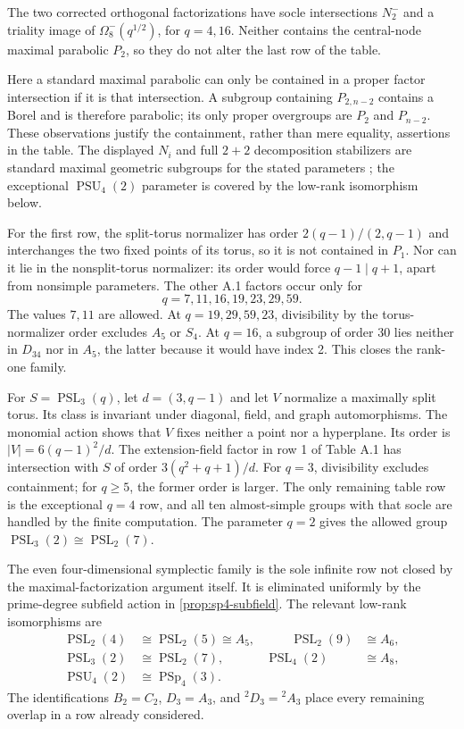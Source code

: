 \documentclass[11pt]{amsart}
\newcommand{\PSL}{\operatorname{PSL}}
\newcommand{\PSU}{\operatorname{PSU}}
\newcommand{\PSp}{\operatorname{PSp}}
\theoremstyle{definition}
\begin{document}
The two corrected orthogonal factorizations have socle intersections
\(N_2^-\) and a triality image of
\(\Omega_8^-(q^{1/2})\), for \(q=4,16\).  Neither contains the central-node
maximal parabolic \(P_2\), so they do not alter the last row of the table.

Here a standard maximal parabolic can only be contained in a proper factor
intersection if it is that intersection.  A subgroup containing
\(P_{2,n-2}\) contains a Borel and is therefore parabolic; its only proper
overgroups are \(P_2\) and \(P_{n-2}\).  These observations justify the
containment, rather than mere equality, assertions in the table.  The
displayed \(N_i\) and full \(2+2\) decomposition stabilizers are standard
maximal geometric subgroups for the stated parameters
\cite[Chapters 3--4]{kleidman-liebeck}; the exceptional
\(\PSU_4(2)\) parameter is covered by the low-rank isomorphism below.

For the first row, the split-torus normalizer has order
\(2(q-1)/(2,q-1)\) and interchanges the two fixed points of its torus, so it
is not contained in \(P_1\).  Nor can it lie in the nonsplit-torus
normalizer: its order would force \(q-1\mid q+1\), apart from nonsimple
parameters.  The other A.1 factors occur only for
\[
q=7,11,16,19,23,29,59.
\]
The values \(7,11\) are allowed.  At \(q=19,29,59,23\), divisibility by the
torus-normalizer order excludes \(A_5\) or \(S_4\).  At \(q=16\), a subgroup
of order 30 lies neither in \(D_{34}\) nor in \(A_5\), the latter because it
would have index 2.  This closes the rank-one family.

For \(S=\PSL_3(q)\), let \(d=(3,q-1)\) and let \(V\) normalize a maximally
split torus.  Its class is invariant under diagonal, field, and graph
automorphisms. The monomial action shows that \(V\) fixes neither a point
nor a hyperplane. Its order is
\(\lvert V\rvert=6(q-1)^2/d\). The extension-field factor in row 1 of
Table A.1 has intersection with
\(S\) of order \(3(q^2+q+1)/d\).  For \(q=3\), divisibility excludes
containment; for \(q\ge5\), the former order is larger.  The only remaining
table row is the exceptional \(q=4\) row, and all ten almost-simple groups
with that socle are handled by the finite computation.  The parameter
\(q=2\) gives the allowed group \(\PSL_3(2)\cong\PSL_2(7)\).

The even four-dimensional symplectic family is the sole infinite row not
closed by the maximal-factorization argument itself. It is eliminated
uniformly by the prime-degree subfield action in
\cref{prop:sp4-subfield}.
The relevant low-rank isomorphisms are
\[
\begin{aligned}
\PSL_2(4)&\cong\PSL_2(5)\cong A_5,
&\qquad \PSL_2(9)&\cong A_6,\\
\PSL_3(2)&\cong\PSL_2(7),
&\PSL_4(2)&\cong A_8,\\
\PSU_4(2)&\cong\PSp_4(3).&&
\end{aligned}
\]
The identifications \(B_2=C_2\), \(D_3=A_3\), and
\({}^2D_3={}^2A_3\) place every remaining overlap in a row already
considered.
\end{document}
